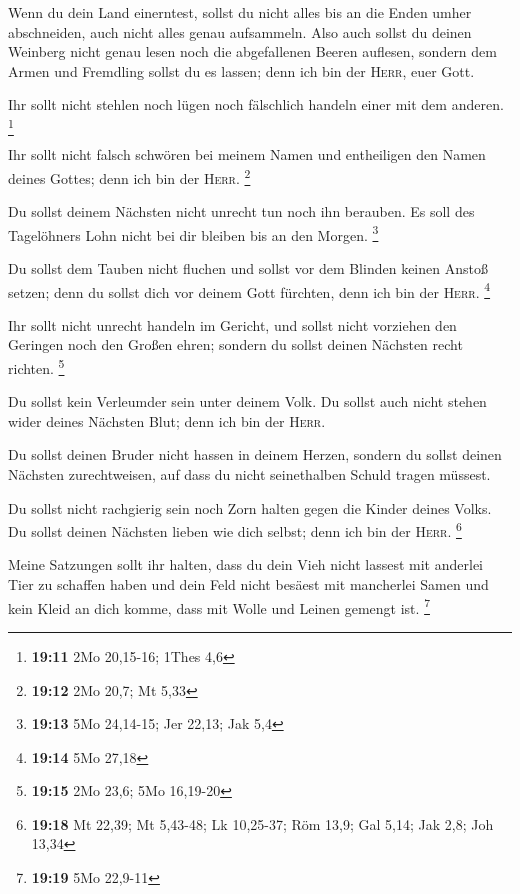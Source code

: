  Wenn du dein Land einerntest, sollst du nicht alles bis
an die Enden umher abschneiden, auch nicht alles genau aufsammeln.
 Also auch sollst du deinen Weinberg nicht genau lesen
noch die abgefallenen Beeren auflesen, sondern dem Armen und Fremdling
sollst du es lassen; denn ich bin der \textsc{Herr}, euer Gott.

 Ihr sollt nicht stehlen noch lügen noch fälschlich
handeln einer mit dem anderen. \footnote{\textbf{19:11} 2Mo 20,15-16;
  1Thes 4,6}

 Ihr sollt nicht falsch schwören bei meinem Namen und
entheiligen den Namen deines Gottes; denn ich bin der \textsc{Herr}.
\footnote{\textbf{19:12} 2Mo 20,7; Mt 5,33}

 Du sollst deinem Nächsten nicht unrecht tun noch ihn
berauben. Es soll des Tagelöhners Lohn nicht bei dir bleiben bis an den
Morgen. \footnote{\textbf{19:13} 5Mo 24,14-15; Jer 22,13; Jak 5,4}

 Du sollst dem Tauben nicht fluchen und sollst vor dem
Blinden keinen Anstoß setzen; denn du sollst dich vor deinem Gott
fürchten, denn ich bin der \textsc{Herr}. \footnote{\textbf{19:14} 5Mo
  27,18}

 Ihr sollt nicht unrecht handeln im Gericht, und sollst
nicht vorziehen den Geringen noch den Großen ehren; sondern du sollst
deinen Nächsten recht richten. \footnote{\textbf{19:15} 2Mo 23,6; 5Mo
  16,19-20}

 Du sollst kein Verleumder sein unter deinem Volk. Du
sollst auch nicht stehen wider deines Nächsten Blut; denn ich bin der
\textsc{Herr}.

 Du sollst deinen Bruder nicht hassen in deinem Herzen,
sondern du sollst deinen Nächsten zurechtweisen, auf dass du nicht
seinethalben Schuld tragen müssest.

 Du sollst nicht rachgierig sein noch Zorn halten gegen
die Kinder deines Volks. Du sollst deinen Nächsten lieben wie dich
selbst; denn ich bin der \textsc{Herr}. \footnote{\textbf{19:18} Mt
  22,39; Mt 5,43-48; Lk 10,25-37; Röm 13,9; Gal 5,14; Jak 2,8; Joh 13,34}

 Meine Satzungen sollt ihr halten, dass du dein Vieh
nicht lassest mit anderlei Tier zu schaffen haben und dein Feld nicht
besäest mit mancherlei Samen und kein Kleid an dich komme, dass mit
Wolle und Leinen gemengt ist. \footnote{\textbf{19:19} 5Mo 22,9-11}

